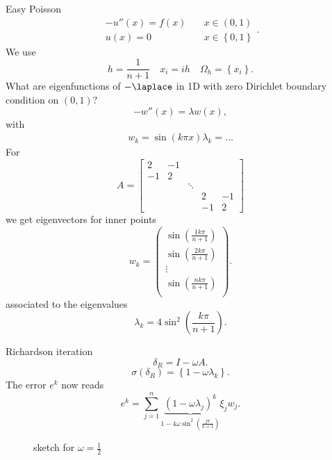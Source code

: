 \begin{exam} Easy Poisson
\[
	\begin{array}{rl}
		-u''(x) = f(x) &\quad x \in (0,1) \\
		u(x) = 0 &\quad x \in \left\{ 0,1 \right\} 
	\end{array}
.\] 	
We use
\[
h = \frac{1}{n+1} \quad x_{i}= ih \quad \Omega _{h} = \left\{ x_{i} \right\} 
.\] 
What are eigenfunctions of $-\laplace$ in 1D with zero Dirichlet boundary condition on $(0,1)$?
\[
	-w''(x) = \lambda w(x)
,\] 
with
\begin{align*}
	w_{k} = \sin(k \pi x)
	\lambda _{k} = \ldots 
\end{align*}
For
\[
A = \begin{bmatrix}
	2 & -1 \\
	-1 & 2 \\
	   && \ddots \\
	   &&&2 & -1 \\
	   &&&-1 & 2
	\end{bmatrix}
\] 
we get eigenvectors for inner points
\[
w_{k} = \begin{pmatrix}
	\sin \left( \frac{1k \pi }{n+1} \right) \\
	\sin \left( \frac{2k \pi }{n+1} \right) \\
	\vdots \\
	\sin \left( \frac{nk \pi }{n+1} \right) \\
\end{pmatrix}
.\] 
associated to the eigenvalues
\[
	\lambda _{k} =  4\sin^2 \left( \frac{k \pi }{n+1} \right) 
.\] 
\end{exam}

Richardson iteration
\[
\delta _{R} = I-\omega A
.\] 
\[
	\sigma (\delta _{R}) = \left\{ 1-\omega \lambda _{k} \right\} 
.\] 
The error $e^{k}$ now reads
\[
	e^{k} = \sum_{j=1}^{n}{\underbrace{(1-\omega \lambda _{j})^{k}}_{1-4 \omega \sin^2 \left( \frac{j \pi }{n+1} \right) } \xi _{j} w_{j}}
.\] 

\begin{figure}[H]
	\begin{center}
	\end{center}
	\caption{sketch for $\omega = \frac{1}{2}$}
	\label{fig:}
\end{figure}

